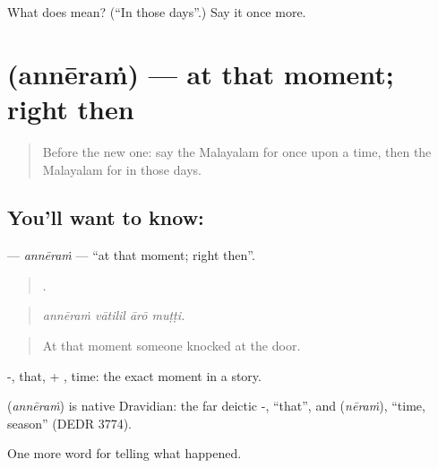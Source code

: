 \begin{tcolorbox}[breakable,colback=teal!4,colframe=teal!35!black,title={Before you move on}]
What does  mean? (\textquotedblleft{}In those days\textquotedblright{}.) Say it once more.
\end{tcolorbox}
\section[\texorpdfstring{\ml{അന്നേരം} (annēraṁ)}{അന്നേരം (annēraṁ)}]{ (annēraṁ) — at that moment; right then}

\label{lesson:ML-C358-anneram}



\begin{quote}
Before the new one: say the Malayalam for once upon a time, then the Malayalam for in those days.
\end{quote}

\subsection*{You'll want to know: }
\textbf{} — \emph{annēraṁ} — \textquotedblleft{}at that moment; right then\textquotedblright{}.

\begin{quote}
   .
\end{quote}

\begin{quote}
\emph{annēraṁ vātilil ārō muṭṭi.}
\end{quote}

\begin{quote}
At that moment someone knocked at the door.
\end{quote}

-, that, + , time: the exact moment in a story.

\begin{cousinweb}
\textbf{} (\emph{annēraṁ}) is native Dravidian: the far deictic -, \textquotedblleft{}that\textquotedblright{}, and  (\emph{nēraṁ}), \textquotedblleft{}time, season\textquotedblright{} (DEDR 3774).
\end{cousinweb}

\begin{grammarlens}[title={What you've built}]
One more word for telling what happened.
\end{grammarlens}

